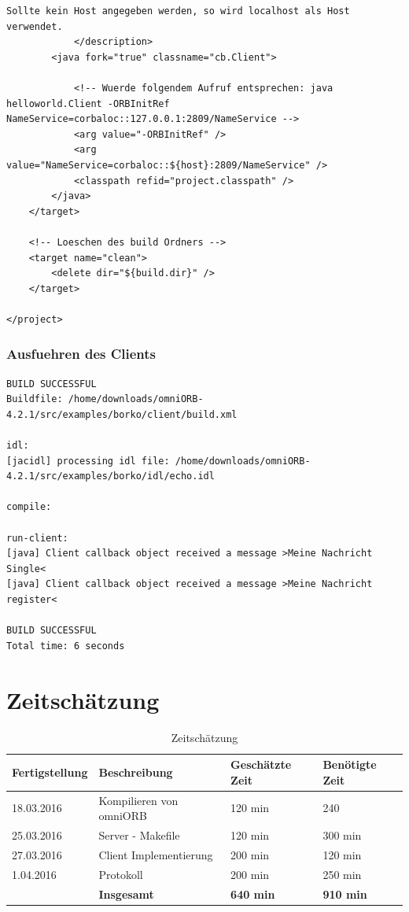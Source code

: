 \begin{lstlisting}[basicstyle=\tiny, style=XML, caption=Code des Clients \cite{borkoRepo}]
				Sollte kein Host angegeben werden, so wird localhost als Host verwendet.
			</description>
		<java fork="true" classname="cb.Client">
		
			<!-- Wuerde folgendem Aufruf entsprechen: java helloworld.Client -ORBInitRef NameService=corbaloc::127.0.0.1:2809/NameService -->
			<arg value="-ORBInitRef" />
			<arg value="NameService=corbaloc::${host}:2809/NameService" />
			<classpath refid="project.classpath" />
		</java>
	</target>
	
	<!-- Loeschen des build Ordners -->
	<target name="clean">
		<delete dir="${build.dir}" />
	</target>
	
</project>

\end{lstlisting}

\subsubsection{Ausfuehren des Clients}
\begin{lstlisting}[style=BashInputStyle, caption=Ausfuehern des Clients]
BUILD SUCCESSFUL
Buildfile: /home/downloads/omniORB-4.2.1/src/examples/borko/client/build.xml

idl:
[jacidl] processing idl file: /home/downloads/omniORB-4.2.1/src/examples/borko/idl/echo.idl

compile:

run-client:
[java] Client callback object received a message >Meine Nachricht Single<
[java] Client callback object received a message >Meine Nachricht register<

BUILD SUCCESSFUL
Total time: 6 seconds
\end{lstlisting}

\clearpage

\section{Zeitschätzung}
\label{sec:Zeit}
\renewcommand{\arraystretch}{1.5}
\begin{table}[!h]
	\center
	\begin{tabular}{ |l|l|l|l| }
		\hline
		\textbf{Fertigstellung} & \textbf{Beschreibung} & \textbf{Geschätzte Zeit} & \textbf{Benötigte Zeit}\\ \hline \hline
		18.03.2016 & Kompilieren von omniORB & 120 min & 240\\ \hline
		25.03.2016 & Server - Makefile & 120 min & 300 min\\ \hline
		27.03.2016 & Client Implementierung & 200 min & 120 min\\ \hline
		1.04.2016 & Protokoll & 200 min & 250 min\\ \hline \hline
		& \textbf{Insgesamt} & \textbf{640 min} & \textbf{910 min} \\ \hline
	\end{tabular}
	\caption{Zeitschätzung}
	\label{methoden}
\end{table}